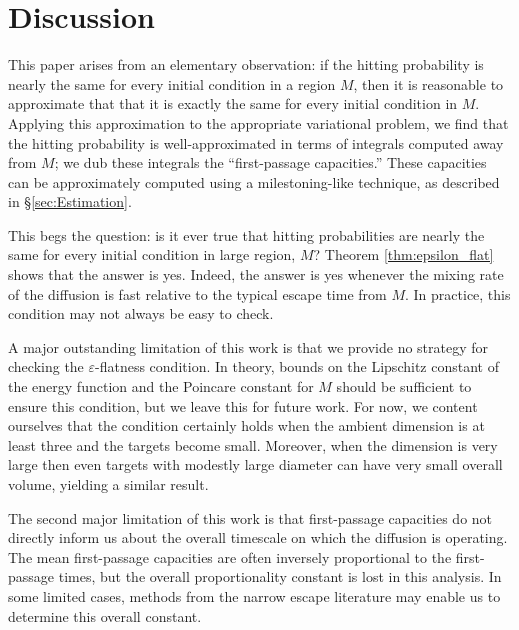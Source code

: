 \documentclass[12pt, nofootinbib,english, amsmath, amssymb, aps, priprint, graphicx,floatfix]{revtex4-1}
\theoremstyle{plain}
\theoremstyle{definition}
\theoremstyle{plain}
\begin{document}
                                                     


\section{Discussion} 
\label{sec:Discussion}

This paper arises from an elementary observation: if the hitting probability is nearly the same for every initial condition in a region $M$, then it is reasonable to approximate that that it is exactly the same for every initial condition in $M$.  Applying this approximation to the appropriate variational problem, we find that the hitting probability is well-approximated in terms of integrals computed away from $M$; we dub these integrals the ``first-passage capacities.''  These capacities can be approximately computed using a milestoning-like technique, as described in \S\ref{sec:Estimation}.  

This begs the question: is it ever true that hitting probabilities are nearly the same for every initial condition in large region, $M$?  Theorem \ref{thm:epsilon_flat} shows that the answer is yes.  Indeed, the answer is yes whenever the mixing rate of the diffusion is fast relative to the typical escape time from $M$.  In practice, this condition may not always be easy to check.  

A major outstanding limitation of this work is that we provide no strategy for checking the $\varepsilon$-flatness condition.  In theory, bounds on the Lipschitz constant of the energy function and the Poincare constant for $M$ should be sufficient to ensure this condition, but we leave this for future work.  For now, we content ourselves that the condition certainly holds when the ambient dimension is at least three and the targets become small.  Moreover, when the dimension is very large then even targets with modestly large diameter can have very small overall volume, yielding a similar result.  

The second major limitation of this work is that first-passage capacities do not directly inform us about the overall timescale on which the diffusion is operating.  The mean first-passage capacities are often inversely proportional to the first-passage times, but the overall proportionality constant is lost in this analysis.  In some limited cases, methods from the narrow escape literature may enable us to determine this overall constant.
\end{document}
